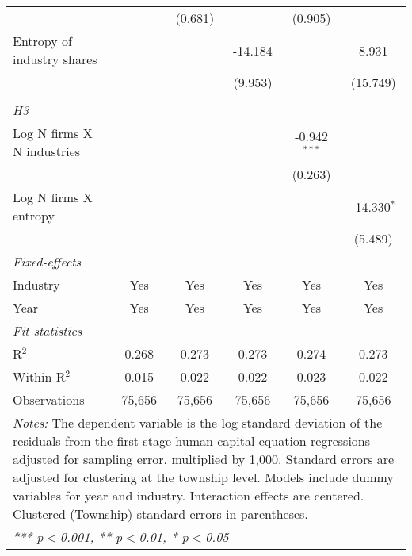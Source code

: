 \begin{tabular}{lccccc}
                                        &                 & (0.681)         &                 & (0.905)         &   \\   
   Entropy of industry shares           &                 &                 & -14.184         &                 & 8.931\\   
                                        &                 &                 & (9.953)         &                 & (15.749)\\   
\hdashline %
\\[0.1ex] %
\emph{H3} \\ 
   Log N firms X N industries           &                 &                 &                 & -0.942$^{***}$  &   \\   
                                        &                 &                 &                 & (0.263)         &   \\   
   Log N firms X entropy                &                 &                 &                 &                 & -14.330$^{*}$\\   
                                        &                 &                 &                 &                 & (5.489)\\   
   \midrule
   \emph{Fixed-effects}\\
   Industry                             & Yes             & Yes             & Yes             & Yes             & Yes\\  
   Year                                 & Yes             & Yes             & Yes             & Yes             & Yes\\  
   \midrule
   \emph{Fit statistics}\\
   R$^2$                                & 0.268           & 0.273           & 0.273           & 0.274           & 0.273\\  
   Within R$^2$                         & 0.015           & 0.022           & 0.022           & 0.023           & 0.022\\  
   Observations                         & 75,656          & 75,656          & 75,656          & 75,656          & 75,656\\  
   \midrule \midrule
\multicolumn{6}{p{16cm}}{\emph{Notes:} The dependent variable is the log 
    standard deviation of the residuals from the first-stage human capital equation 
    regressions adjusted for sampling error, multiplied by 1,000. Standard errors 
    are adjusted for clustering at the township level. Models include dummy variables 
    for year and industry. Interaction effects are centered. Clustered (Township) 
    standard-errors in parentheses.}\\
\multicolumn{6}{l}{\emph{*** p$<$0.001, ** p$<$0.01, * p$<$0.05}} \\ 
\end{tabular}
\par\endgroup

